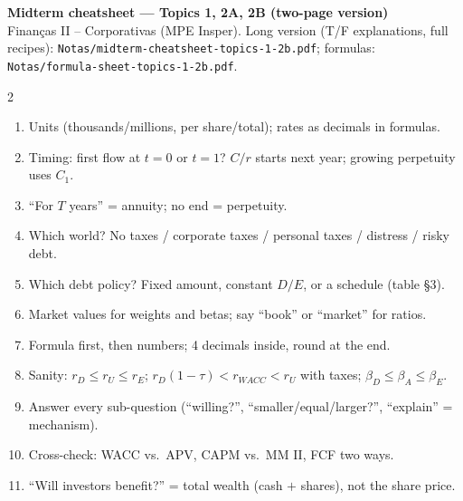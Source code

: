 \documentclass[8pt,a4paper]{extarticle}
\newcommand{\sect}[1]{\par\needspace{4\baselineskip}\smallskip{\color{hd}\large\bfseries #1}\par\nopagebreak\vspace{1pt}}
\begin{document}
\begin{center}
{\Large\bfseries Midterm cheatsheet --- Topics 1, 2A, 2B (two-page version)}\\
{\footnotesize Finan\c{c}as II -- Corporativas (MPE Insper). Long version (T/F explanations, full recipes):
\texttt{Notas/midterm-cheatsheet-topics-1-2b.pdf}; formulas: \texttt{Notas/formula-sheet-topics-1-2b.pdf}.}
\end{center}
\vspace{-6pt}
\begin{multicols}{2}

\sect{0. Every question}
\begin{enumerate}[label=\arabic*.]
  \item Units (thousands/millions, per share/total); rates as decimals in formulas.
  \item Timing: first flow at $t=0$ or $t=1$? $C/r$ starts next year; growing perpetuity uses $C_1$.
  \item ``For $T$ years'' = annuity; no end = perpetuity.
  \item Which world? No taxes / corporate taxes / personal taxes / distress / risky debt.
  \item Which debt policy? Fixed amount, constant $D/E$, or a schedule (table §3).
  \item Market values for weights and betas; say ``book'' or ``market'' for ratios.
  \item Formula first, then numbers; 4 decimals inside, round at the end.
  \item Sanity: $r_D\le r_U\le r_E$; $r_D(1-\tau)<r_{WACC}<r_U$ with taxes; $\beta_D\le\beta_A\le\beta_E$.
  \item Answer every sub-question (``willing?'', ``smaller/equal/larger?'', ``explain'' = mechanism).
  \item Cross-check: WACC vs.\ APV, CAPM vs.\ MM II, FCF two ways.
  \item ``Will investors benefit?'' = total wealth (cash $+$ shares), not the share price.
\end{enumerate}


\end{multicols}
\end{document}
